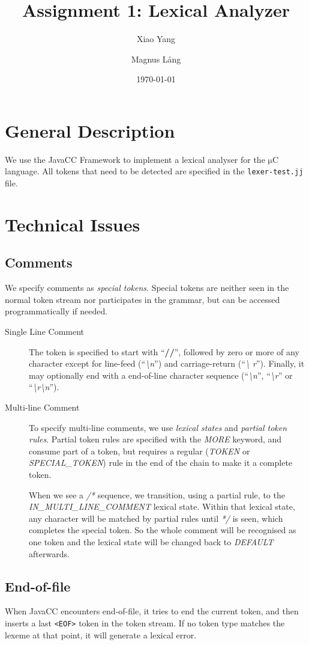 \documentclass[a4paper,11pt]{article}
\title{Assignment 1: Lexical Analyzer}
\author{Xiao Yang \and Magnus L{\aa}ng} %
\date{\today}
\newcommand{\token}[1]{\texttt{<#1>}}
\newcommand{\uC}{{$\mathrm{\mu}$}C }
\begin{document}
\maketitle
\section{General Description}
We use the JavaCC Framework to implement a lexical analyser for the \uC
language. All tokens that need to be detected are specified in the
\texttt{lexer-test.jj} file.

\section{Technical Issues}
\subsection{Comments}
We specify comments as \emph{special tokens}. Special tokens are neither seen in
the normal token stream nor participates in the grammar, but can be accessed
programmatically if needed.
\begin{description}
\item[Single Line Comment] The token is specified to start with ``\textbf{//}'',
  followed by zero or more of any character except for line-feed
  (``\textit{\textbackslash n}'') and carriage-return (``\textit{\textbackslash
    r}''). Finally, it may optionally end with a end-of-line character sequence
  (``\textit{\textbackslash n}'', ``\textit{\textbackslash r}'' or
  ``\textit{\textbackslash r\textbackslash n}'').
\item[Multi-line Comment] To specify multi-line comments, we use \emph{lexical
    states} and \emph{partial token rules}. Partial token rules are specified
  with the \emph{MORE} keyword, and consume part of a token, but requires a
  regular (\emph{TOKEN} or \emph{SPECIAL\_TOKEN}) rule in the end of the chain
  to make it a complete token.

  When we see a \textit{/*} sequence, we transition, using a partial rule, to
  the \emph{IN\_MULTI\_LINE\_COMMENT} lexical state. Within that lexical state,
  any character will be matched by partial rules until \textit{*/} is seen,
  which completes the special token. So the whole comment will be recognised as
  one token and the lexical state will be changed back to \emph{DEFAULT}
  afterwards.

\end{description}
\subsection{End-of-file}
When JavaCC encounters end-of-file, it tries to end the current token, and then
inserts a last \token{EOF} token in the token stream. If no token type matches
the lexeme at that point, it will generate a lexical error.
\end{document}

